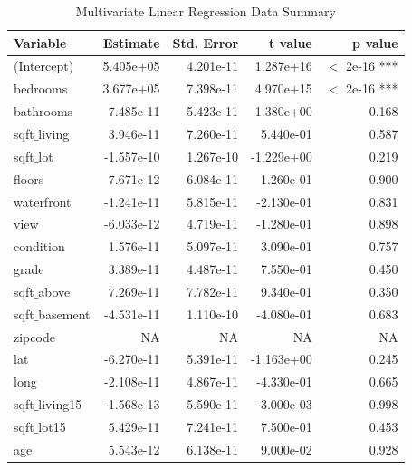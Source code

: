 \documentclass[a4paper, 12pt]{article}
\begin{document}
\begin{table}[ht]
\centering
\begin{tabular}{|l|r|r|r|r|}
\hline
\textbf{Variable} & \textbf{Estimate} & \textbf{Std. Error} & \textbf{t value} & \textbf{p value} \\
\hline
(Intercept)       & 5.405e+05   & 4.201e-11  & 1.287e+16  & $<$ 2e-16 ***  \\
bedrooms          & 3.677e+05   & 7.398e-11  & 4.970e+15  & $<$ 2e-16 ***  \\
bathrooms         & 7.485e-11   & 5.423e-11  & 1.380e+00  & 0.168        \\
sqft$\_$living       & 3.946e-11   & 7.260e-11  & 5.440e-01  & 0.587        \\
sqft$\_$lot          & -1.557e-10  & 1.267e-10  & -1.229e+00 & 0.219        \\
floors            & 7.671e-12   & 6.084e-11  & 1.260e-01  & 0.900        \\
waterfront        & -1.241e-11  & 5.815e-11  & -2.130e-01 & 0.831        \\
view              & -6.033e-12  & 4.719e-11  & -1.280e-01 & 0.898        \\
condition         & 1.576e-11   & 5.097e-11  & 3.090e-01  & 0.757        \\
grade             & 3.389e-11   & 4.487e-11  & 7.550e-01  & 0.450        \\
sqft$\_$above        & 7.269e-11   & 7.782e-11  & 9.340e-01  & 0.350        \\
sqft$\_$basement     & -4.531e-11  & 1.110e-10  & -4.080e-01 & 0.683        \\
zipcode           & NA          & NA         & NA         & NA           \\
lat               & -6.270e-11  & 5.391e-11  & -1.163e+00 & 0.245        \\
long              & -2.108e-11  & 4.867e-11  & -4.330e-01 & 0.665        \\
sqft$\_$living15     & -1.568e-13  & 5.590e-11  & -3.000e-03 & 0.998        \\
sqft$\_$lot15        & 5.429e-11   & 7.241e-11  & 7.500e-01  & 0.453        \\
age               & 5.543e-12   & 6.138e-11  & 9.000e-02  & 0.928        \\
\hline
\end{tabular}
\caption{Multivariate Linear Regression Data Summary}
\label{tab:mlrcoeffs}
\end{table}
\end{document}
